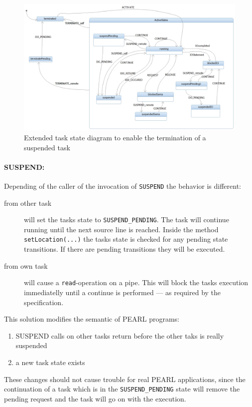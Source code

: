 \begin{figure}[pbht]
\begin{center}
\includegraphics[width=14cm]{../doc_stuff/taskStatesLinux.jpg}
\end{center}
\caption{Extended task state diagram to enable the termination of a 
         suspended task}
\label{taskStatesLinux}
\end{figure}

\paragraph{SUSPEND:}
Depending of the caller of the invocation of \verb|SUSPEND| the behavior
is different:
\begin{description}
\item[from other task] will set the tasks state to \verb|SUSPEND_PENDING|. 
   The task will continue running until the next source line is reached. 
   Inside the method \verb|setLocation(...)| the tasks state is checked for
   any pending state transitions. If there are pending transitions they will 
   be executed.
\item[from own task] will cause a \verb|read|-operation on a pipe. This
   will block the tasks execution immediatelly until a continue is performed
   --- as required by the specification.
\end{description}

This solution modifies the semantic of PEARL programs:
\begin{enumerate}
\item SUSPEND calls on other tasks return before the other taks is really 
    suspended
\item a new task state exists
\end{enumerate}
These changes should not cause trouble for real PEARL applications, since
the continuation of a task which is in the \verb|SUSPEND_PENDING| state
will remove the pending request and the task will go on with the execution.

